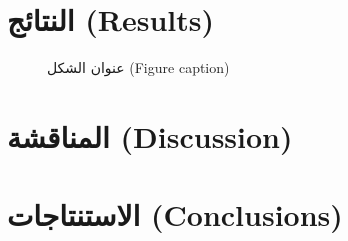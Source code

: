 \documentclass[11pt,a4paper]{article}
\begin{document}

\section{النتائج (Results)}
\label{sec:results}


\begin{figure}[H]
\centering
\caption{عنوان الشكل (Figure caption)}
\end{figure}

\section{المناقشة (Discussion)}
\label{sec:discussion}


\section{الاستنتاجات (Conclusions)}
\label{sec:conclusion}




\end{document}
